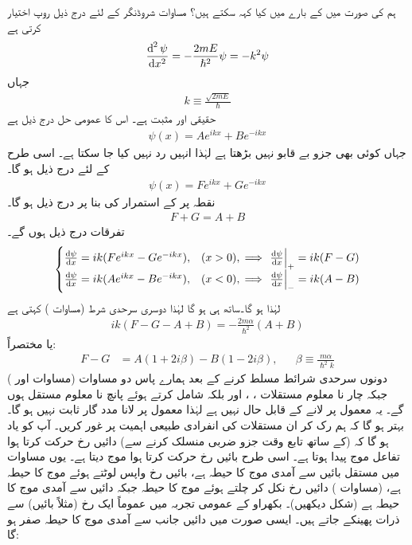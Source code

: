 ہم  کی صورت میں  کے بارے میں کیا کہہ سکتے ہیں؟ مساوات شروڈنگر  کے لئے درج ذیل روپ اختیار کرتی ہے
\begin{align*}
\frac{\dif^{\,2}\psi}{\dif x^2}=-\frac{2mE}{\hslash^2}\psi=-k^2\psi
\end{align*}
 جہاں
\begin{align}\label{مساوات_شروڈنگر_مستقل_کے}
k\equiv\frac{\sqrt{2mE}}{\hslash}
\end{align}
 حقیقی اور مثبت ہے۔ اس کا عمومی حل درج ذیل ہے
\begin{align}\label{مساوات_شروڈنگر_بایاں_حل_ڈیلٹا}
\psi(x)=Ae^{ikx}+Be^{-ikx}
\end{align}
جہاں کوئی بھی جزو بے قابو نہیں بڑھتا ہے لہٰذا انہیں رد نہیں کیا جا سکتا ہے۔ اسی طرح  کے لئے درج ذیل ہو گا۔
\begin{align}\label{مساوات_شروڈنگر_دایاں_حل_ڈیلٹا}
\psi(x)=Fe^{ikx}+Ge^{-ikx}
\end{align}
نقطہ  پر  کے استمرار کی بنا پر درج ذیل ہو گا۔
\begin{align}\label{مساوات_شروڈنگر_شرط_اول}
F+G=A+B
\end{align}
تفرقات درج ذیل ہوں گے۔
\begin{align*}
\begin{cases}
\frac{\dif\psi}{\dif x}=ik(Fe^{ikx}-Ge^{-ikx}),& (x>0),\implies \left.\frac{\dif\psi}{\dif x}\right|_{+}=ik(F-G)\\
\frac{\dif\psi}{\dif x}=ik(Ae^{ikx}-Be^{-ikx}),& (x<0),\implies \left.\frac{\dif\psi}{\dif x}\right|_{-}=ik(A-B)
\end{cases}
\end{align*}
لہٰذا  ہو گا۔ساتھ ہی  ہو گا لہٰذا دوسری سرحدی شرط (مساوات ) کہتی ہے
\begin{align}
ik(F-G-A+B)=-\frac{2m\alpha}{\hslash^2}(A+B)
\end{align}
یا مختصراً:
\begin{align}\label{مساوات_شروڈنگر_شرط_دوم}
F-G&=A(1+2i\beta)-B(1-2i\beta),&&\beta\equiv\frac{m\alpha}{\hslash^2 k}
\end{align}
دونوں سرحدی شرائط مسلط کرنے کے بعد ہمارے پاس دو مساوات (مساوات  اور ) جبکہ چار نا معلوم مستقلات ، ،  اور  بلکہ  شامل کرتے ہوئے پانچ نا معلوم مستقل ہوں گے۔ یہ معمول پر لانے کے قابل حال نہیں ہے لہٰذا معمول پر لانا مدد گار ثابت نہیں ہو گا۔ بہتر ہو گا کہ ہم رک کر ان مستقلات کی انفرادی طبیعی اہمیت پر غور کریں۔ آپ کو یاد ہو گا کہ  (کے ساتھ تابع وقت جزو ضربی  منسلک کرنے سے) دائیں رخ حرکت کرتا ہوا تفاعل موج پیدا ہوتا ہے۔ اسی طرح  بائیں رخ حرکت کرتا ہوا موج دیتا ہے۔ یوں مساوات  میں مستقل  بائیں سے آمدی موج کا حیطہ ہے،  بائیں رخ واپس لوٹتے ہوئے موج کا حیطہ ہے،  (مساوات ) دائیں رخ نکل کر چلتے ہوئے موج کا حیطہ جبکہ  دائیں سے آمدی موج کا حیطہ ہے (شکل  دیکھیں)۔ بکھراو کے عمومی تجربہ میں عموماً ایک رخ (مثلاً بائیں) سے ذرات پھینکے جاتے ہیں۔ ایسی صورت میں دائیں جانب سے آمدی موج کا حیطہ صفر ہو گا:
